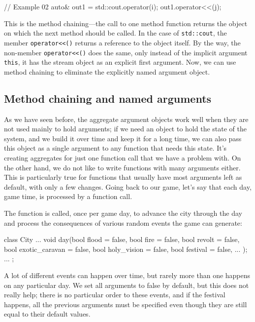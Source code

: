\begin{code}
// Example 02
auto& out1 = std::cout.operator(i);
out1.operator<<(j);
\end{code}

This is the method chaining---the call to one method function returns the object on which the next method should be called. In the case of \texttt{std::cout}, the member \texttt{operator\textless{}\textless{}()} returns a reference to the object itself. By the way, the non-member \texttt{operator\textless{}\textless{}()} does the same, only instead of the implicit argument \texttt{this}, it has the stream object as an explicit first argument. Now, we can use method chaining to eliminate the explicitly named argument object.

\subsection{Method chaining and named arguments}

As we have seen before, the aggregate argument objects work well when they are not used mainly to hold arguments; if we need an object to hold the state of the system, and we build it over time and keep it for a long time, we can also pass this object as a single argument to any function that needs this state. It's creating aggregates for just one function call that we have a problem with. On the other hand, we do not like to write functions with many arguments either. This is particularly true for functions that usually have most arguments left as default, with only a few changes. Going back to our game, let's say that each day, game time, is processed by a function call.

The function is called, once per game day, to advance the city through the day and process the consequences of various random events the game can generate:

\begin{code}
class City {
  ...
  void day(bool flood = false, bool fire = false,
    bool revolt = false, bool exotic_caravan = false,
    bool holy_vision = false, bool festival = false, ... );
  ...
};
\end{code}

A lot of different events can happen over time, but rarely more than one happens on any particular day. We set all arguments to false by default, but this does not really help; there is no particular order to these events, and if the festival happens, all the previous arguments must be specified even though they are still equal to their default values.

